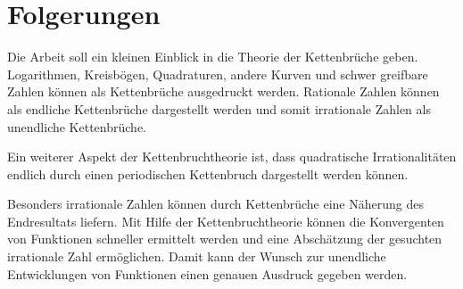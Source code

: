 %
%
%
\section{Folgerungen
\label{kettenbruch:section:folgerungen}}
Die Arbeit soll ein kleinen Einblick in die Theorie der Kettenbrüche geben.
Logarithmen, Kreisbögen, Quadraturen, andere Kurven und schwer
greifbare Zahlen können als Kettenbrüche ausgedruckt werden. Rationale
%
%
%
Zahlen können als endliche Kettenbrüche dargestellt werden und somit
irrationale Zahlen als unendliche Kettenbrüche.

Ein weiterer Aspekt der Kettenbruchtheorie ist, dass quadratische Irrationalitäten endlich durch einen periodischen Kettenbruch dargestellt werden können.

Besonders irrationale Zahlen können durch Kettenbrüche eine Näherung
des Endresultats liefern.
Mit Hilfe der Kettenbruchtheorie können die Konvergenten von
Funktionen schneller ermittelt werden und eine Abschätzung der
gesuchten irrationale Zahl ermöglichen.
Damit kann der Wunsch zur unendliche Entwicklungen von Funktionen
einen genauen Ausdruck gegeben werden.
